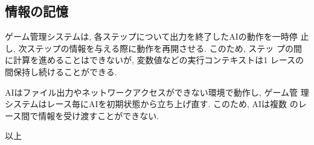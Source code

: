 \documentclass[11pt]{jarticle}
\begin{document}
\subsection{情報の記憶}
ゲーム管理システムは, 各ステップについて出力を終了したAIの動作を一時停
止し, 次ステップの情報を与える際に動作を再開させる.  このため, ステッ
プの間に計算を進めることはできないが, 変数値などの実行コンテキストは1
レースの間保持し続けることができる.

AIはファイル出力やネットワークアクセスができない環境で動作し, ゲーム管
理システムはレース毎にAIを初期状態から立ち上げ直す. このため, AIは複数
のレース間で情報を受け渡すことができない.

\begin{flushright}
以上
\end{flushright}
\end{document}
